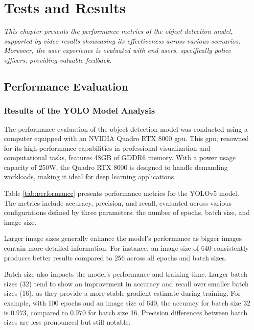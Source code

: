 \chapter{Tests and Results}
\label{chapter:tests}

\newenvironment{tests}
{\quote\itshape}
{\endquote}

\begin{tests}
    This chapter presents the performance metrics of the object detection model, supported by video results 
    showcasing its effectiveness across various scenarios. Moreover, the user experience is evaluated with 
    end users, specifically police officers, providing valuable feedback.
\end{tests}

\section{Performance Evaluation}
\subsection{Results of the YOLO Model Analysis}
The performance evaluation of the object detection model was conducted using a computer equipped with an NVIDIA 
Quadro RTX 8000 \ac{gpu}. This \ac{gpu}, renowned for its high-performance capabilities in professional visualization and 
computational tasks, features 48GB of GDDR6 memory. With a power usage capacity of 250W, 
the Quadro RTX 8000 is designed to handle demanding workloads, making it ideal for deep learning applications.

Table \ref{tab:performance} presents performance metrics for the YOLOv5 model. The metrics include accuracy, 
precision, and recall, evaluated across various configurations defined by three parameters: the number of epochs, 
batch size, and image size.

Larger image sizes generally enhance the model's performance as bigger images contain more detailed information.
For instance, an image size of 640 consistently produces better results compared to 256 across all epochs and batch sizes. 

Batch size also impacts the model's performance and training time. Larger batch sizes (32) tend to show an 
improvement in accuracy and recall over smaller batch sizes (16), as they provide a more stable gradient estimate 
during training. For example, with 100 epochs and an image size of 640, the accuracy for batch size 32 is 0.973, 
compared to 0.970 for batch size 16. Precision differences between batch sizes are less pronounced but still notable. 

